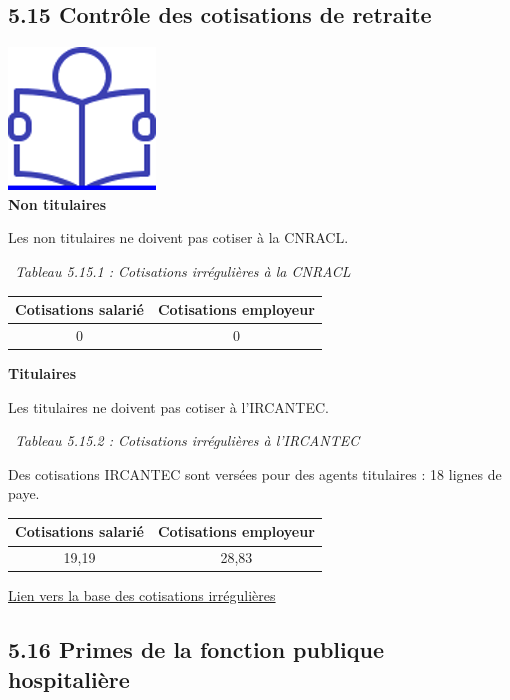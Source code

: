 \hypertarget{controle-des-cotisations-de-retraite}{%
\subsection{5.15 Contrôle des cotisations de
retraite}\label{controle-des-cotisations-de-retraite}}

\href{../Docs/Notices/fiche_retraite.odt}{\includegraphics{icones/Notice.png}}\\
\textbf{Non titulaires}

Les non titulaires ne doivent pas cotiser à la CNRACL.

~\emph{Tableau 5.15.1 : Cotisations irrégulières à la CNRACL}

\begin{longtable}[]{@{}cc@{}}
\toprule
Cotisations salarié & Cotisations employeur\tabularnewline
\midrule
\endhead
0 & 0\tabularnewline
\bottomrule
\end{longtable}

\textbf{Titulaires}

Les titulaires ne doivent pas cotiser à l'IRCANTEC.

~\emph{Tableau 5.15.2 : Cotisations irrégulières à l'IRCANTEC}

Des cotisations IRCANTEC sont versées pour des agents titulaires : 18
lignes de paye.

\begin{longtable}[]{@{}cc@{}}
\toprule
Cotisations salarié & Cotisations employeur\tabularnewline
\midrule
\endhead
19,19 & 28,83\tabularnewline
\bottomrule
\end{longtable}

\href{../Bases/Reglementation/Cotisations.irreg.ircantec.csv}{Lien vers la
base des cotisations irrégulières}

\hypertarget{primes-de-la-fonction-publique-hospitaliere}{%
\subsection{5.16 Primes de la fonction publique
hospitalière}\label{primes-de-la-fonction-publique-hospitaliere}}

